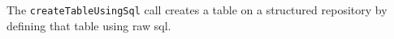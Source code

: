 The \verb+createTableUsingSql+ call creates a table on a structured repository by defining that table using raw sql.
